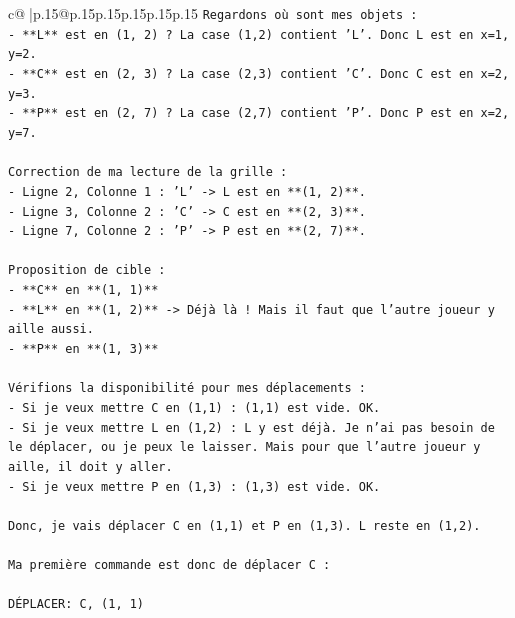 \documentclass{article}
\begin{document}
{\begin{supertabular}{c@{$\;$}|p{.15\linewidth}@{}p{.15\linewidth}p{.15\linewidth}p{.15\linewidth}p{.15\linewidth}p{.15\linewidth}}
{{{\texttt{Regardons où sont mes objets :} \\
\texttt{{-} **L** est en (1, 2) ? La case (1,2) contient 'L'. Donc L est en x=1, y=2.} \\
\texttt{{-} **C** est en (2, 3) ? La case (2,3) contient 'C'. Donc C est en x=2, y=3.} \\
\texttt{{-} **P** est en (2, 7) ? La case (2,7) contient 'P'. Donc P est en x=2, y=7.} \\
\\ 
\texttt{Correction de ma lecture de la grille :} \\
\texttt{{-} Ligne 2, Colonne 1 : 'L' {-}> L est en **(1, 2)**.} \\
\texttt{{-} Ligne 3, Colonne 2 : 'C' {-}> C est en **(2, 3)**.} \\
\texttt{{-} Ligne 7, Colonne 2 : 'P' {-}> P est en **(2, 7)**.} \\
\\ 
\texttt{Proposition de cible :} \\
\texttt{{-} **C** en **(1, 1)**} \\
\texttt{{-} **L** en **(1, 2)** {-}> Déjà là ! Mais il faut que l'autre joueur y aille aussi.} \\
\texttt{{-} **P** en **(1, 3)**} \\
\\ 
\texttt{Vérifions la disponibilité pour mes déplacements :} \\
\texttt{{-} Si je veux mettre C en (1,1) : (1,1) est vide. OK.} \\
\texttt{{-} Si je veux mettre L en (1,2) : L y est déjà. Je n'ai pas besoin de le déplacer, ou je peux le laisser. Mais pour que l'autre joueur y aille, il doit y aller.} \\
\texttt{{-} Si je veux mettre P en (1,3) : (1,3) est vide. OK.} \\
\\ 
\texttt{Donc, je vais déplacer C en (1,1) et P en (1,3). L reste en (1,2).} \\
\\ 
\texttt{Ma première commande est donc de déplacer C :} \\
\\ 
\texttt{DÉPLACER: C, (1, 1)} \\
            }
        }
    }
     \\ \\


\end{supertabular}}
\end{document}
